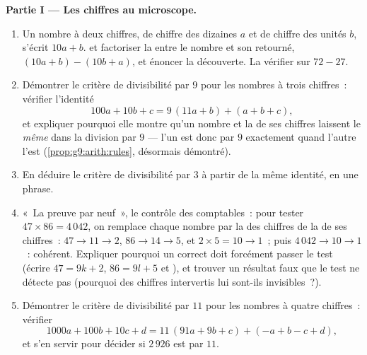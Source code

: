 \begin{problem}
\medskip
\noindent\textbf{Partie I --- Les chiffres au microscope.}
\begin{enumerate}
  \item Un nombre à deux chiffres, de chiffre des dizaines $a$ et de
        chiffre des unités $b$, s'écrit $10a + b$.  et
        factoriser la  entre le nombre et son retourné,
        $(10a + b) - (10b + a)$, et énoncer la découverte. La
        vérifier sur $72 - 27$.
  \item Démontrer le critère de divisibilité par $9$ pour les
        nombres à trois chiffres~: vérifier l'identité
        \[
        100a + 10b + c = 9\,(11a + b) + (a + b + c),
        \]
        et expliquer pourquoi elle montre qu'un nombre et la 
        de ses chiffres laissent le \emph{même } dans la
        division par $9$ --- l'un est donc  par $9$
        exactement quand l'autre l'est
        (\cref{prop:g9:arith:rules}, désormais démontré).
  \item En déduire le critère de divisibilité par $3$ à partir de la
        même identité, en une phrase.
  \item «~La preuve par neuf~», le contrôle des comptables~: pour
        tester $47 \times 86 = 4\,042$, on remplace chaque nombre
        par la  des chiffres de la  de ses chiffres~:
        $47 \to 11 \to 2$, $86 \to 14 \to 5$, et
        $2 \times 5 = 10 \to 1$~; puis $4\,042 \to 10 \to 1$~:
        cohérent. Expliquer pourquoi un  correct doit
        forcément passer le test (écrire $47 = 9k + 2$,
        $86 = 9l + 5$ et ), et trouver un résultat faux
        que le test ne détecte pas (pourquoi des chiffres intervertis
        lui sont-ils invisibles~?).
  \item Démontrer le critère de divisibilité par $11$ pour les
        nombres à quatre chiffres~: vérifier
        \[
        1000a + 100b + 10c + d
        = 11\,(91a + 9b + c) + (- a + b - c + d),
        \]
        et s'en servir pour décider si $2\,926$ est  par
        $11$.
\end{enumerate}


\end{problem}
